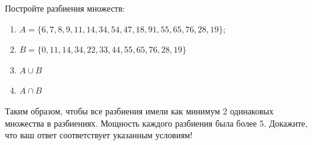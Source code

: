 \question
Постройте разбиения множеств:
\begin{enumerate}
	\renewcommand{\labelenumi}{\alph{enumi})}
	\item $A = \{6, 7, 8, 9, 11, 14, 34, 54, 47, 18, 91, 55, 65, 76, 28, 19\};$
	\item $B = \{0, 11, 14, 34, 22, 33, 44, 55, 65, 76, 28, 19\}$
	\item $A \cup B$
	\item $A \cap B$
\end{enumerate}
Таким образом, чтобы все разбиения имели как минимум 2 одинаковых множества в разбиениях.
Мощность каждого разбиения была более 5.
Докажите, что ваш ответ соответствует указанным условиям!
